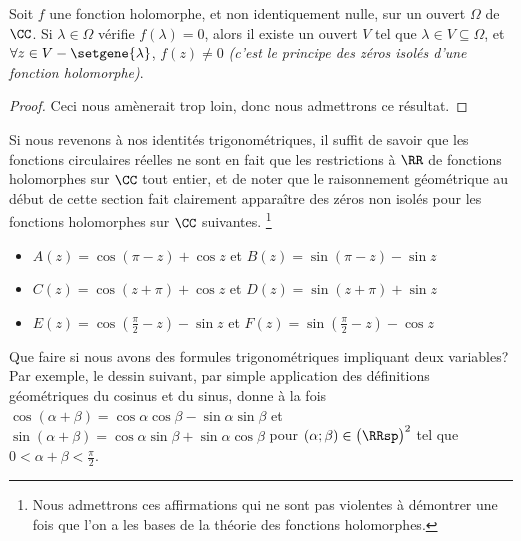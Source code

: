 \begin{fact} \label{holo-nullity}
	Soit $f$ une fonction holomorphe, et non identiquement nulle, sur un ouvert $\Omega$ de $\CC$. 
	Si $\lambda \in \Omega$ vérifie $f(\lambda) = 0$,
	alors il existe un ouvert $V$ tel que 
	$\lambda \in V \subseteq \Omega$,
	et
	$\forall z \in V - \setgene{\lambda}$, $f(z) \neq 0$ 
	\emph{(c'est le principe des zéros isolés d'une fonction holomorphe)}. 
\end{fact}


\begin{proof}
	Ceci nous amènerait trop loin, donc nous admettrons ce résultat.
\end{proof}


Si nous revenons à nos identités trigonométriques, il suffit de savoir que les fonctions circulaires réelles ne sont en fait que les restrictions à $\RR$ de fonctions holomorphes sur $\CC$ tout entier, et de noter que le raisonnement géométrique au début de cette section fait clairement apparaître des zéros non isolés pour les fonctions holomorphes sur $\CC$ suivantes.%
\footnote{
	Nous admettrons ces affirmations qui ne sont pas violentes à démontrer une fois que l'on a les bases de la théorie des fonctions holomorphes.
}
%
\begin{itemize}[label=\small\textbullet]
	\item $A(z) = \cos (\pi - z) + \cos z$ 
	   et $B(z) =\sin (\pi - z) - \sin z$ 

	\smallskip
	\item $C(z) =\cos (z + \pi) + \cos z$ 
	   et $D(z) =\sin (z + \pi) + \sin z$

	\smallskip
	\item $E(z) =\cos \left( \frac{\pi}{2} - z \right) - \sin z$ 
	   et $F(z) =\sin \left( \frac{\pi}{2} - z \right) - \cos z$ 
\end{itemize}


Que faire si nous avons des formules trigonométriques impliquant deux variables? Par exemple, le dessin suivant, par simple application des définitions géométriques du cosinus et du sinus, donne à la fois
$\cos(\alpha + \beta) = \cos \alpha \cos \beta - \sin \alpha \sin \beta$
et
$\sin(\alpha + \beta) = \cos \alpha \sin \beta + \sin \alpha \cos \beta$
pour
$(\alpha ; \beta) \in \big( \RRsp \big)^2$ tel que $0 < \alpha + \beta < \frac{\pi}{2}$. 

\begin{center}
\end{center}
